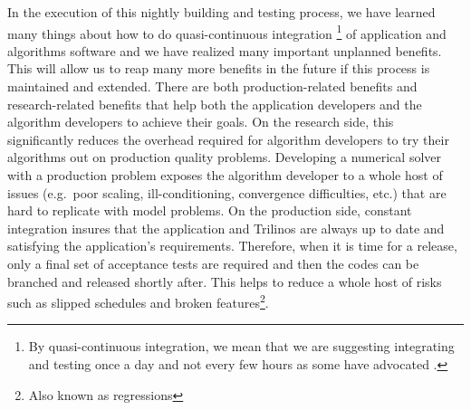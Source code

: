 \documentclass[pdf,ps2pdf,11pt]{SANDreport}
\begin{document}
In the execution of this nightly building and testing process, we have learned
many things about how to do quasi-continuous integration {}\cite[Section
29.4]{book:code-complete-2}\footnote{By quasi-continuous integration, we mean
that we are suggesting integrating and testing once a day and not every few
hours as some have advocated {}\cite{continuous-integration}.} of application
and algorithms software and we have realized many important unplanned
benefits.  This will allow us to reap many more benefits in the future if this
process is maintained and extended.  There are both production-related
benefits and research-related benefits that help both the application
developers and the algorithm developers to achieve their goals.  On the
research side, this significantly reduces the overhead required for algorithm
developers to try their algorithms out on production quality problems.
Developing a numerical solver with a production problem exposes the algorithm
developer to a whole host of issues (e.g.\ poor scaling, ill-conditioning,
convergence difficulties, etc.) that are hard to replicate with model
problems.  On the production side, constant integration insures that the
application and Trilinos are always up to date and satisfying the
application's requirements.  Therefore, when it is time for a release, only a
final set of acceptance tests are required and then the codes can be branched
and released shortly after.  This helps to reduce a whole host of risks such
as slipped schedules and broken features\footnote{Also known as regressions}.
\end{document}
